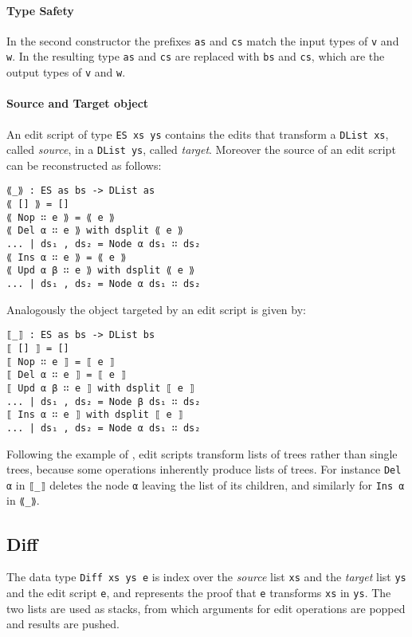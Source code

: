 \documentclass[../Thesis.tex]{subfiles}
\begin{document}
	\paragraph{Type Safety}
	In the second constructor the prefixes \texttt{as} and \texttt{cs} match
	the input types of \texttt{v} and \texttt{w}.
	In the resulting type \texttt{as} and \texttt{cs} are replaced with
	\texttt{bs} and \texttt{cs}, which are the output types of 
	\texttt{v} and \texttt{w}.
	
	\paragraph{Source and Target object}
	An edit script of type \texttt{ES xs ys} contains the edits
	that transform a \texttt{DList xs}, called \emph{source}, 
	in a \texttt{DList ys}, called \emph{target}. 
	Moreover the source of an edit script can be reconstructed as follows:
		
\begin{verbatim}
⟪_⟫ : ES as bs -> DList as
⟪ [] ⟫ = []
⟪ Nop ∷ e ⟫ = ⟪ e ⟫
⟪ Del α ∷ e ⟫ with dsplit ⟪ e ⟫
... | ds₁ , ds₂ = Node α ds₁ ∷ ds₂
⟪ Ins α ∷ e ⟫ = ⟪ e ⟫
⟪ Upd α β ∷ e ⟫ with dsplit ⟪ e ⟫
... | ds₁ , ds₂ = Node α ds₁ ∷ ds₂
\end{verbatim}

Analogously the object targeted by an edit script is given by:

\begin{verbatim}
⟦_⟧ : ES as bs -> DList bs
⟦ [] ⟧ = []
⟦ Nop ∷ e ⟧ = ⟦ e ⟧
⟦ Del α ∷ e ⟧ = ⟦ e ⟧
⟦ Upd α β ∷ e ⟧ with dsplit ⟦ e ⟧
... | ds₁ , ds₂ = Node β ds₁ ∷ ds₂
⟦ Ins α ∷ e ⟧ with dsplit ⟦ e ⟧
... | ds₁ , ds₂ = Node α ds₁ ∷ ds₂
\end{verbatim}

Following the example of \cite{Lemp09}, edit scripts transform lists of trees rather than single trees, because some operations inherently produce lists of trees.
For instance \texttt{Del α} in \texttt{⟦\_⟧} deletes the node \texttt{α} 
leaving the list of its children, and similarly for \texttt{Ins α} in \texttt{⟪\_⟫}.

	\subsection{Diff}	
	\label{subsec:Diff}
	The data type \texttt{Diff xs ys e} is index over the \emph{source}  list 
	\texttt{xs} and the \emph{target} list \texttt{ys} and the edit script 
	\texttt{e},  and represents the proof that \texttt{e} transforms \texttt{xs} 	in \texttt{ys}.
	The two lists are used as stacks, from which arguments for 
	edit operations are popped and results are pushed.
\end{document}
